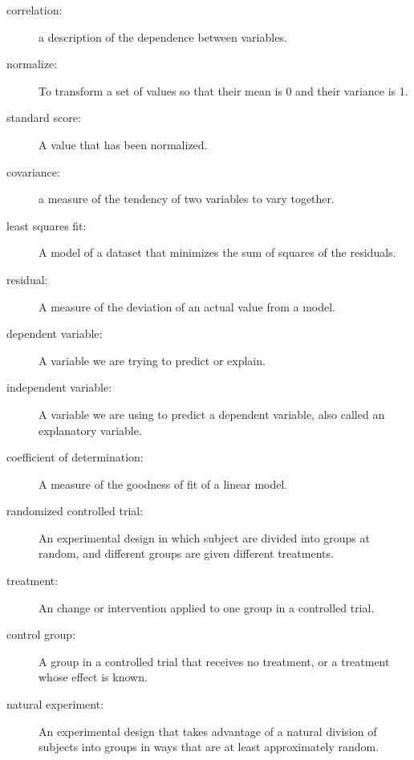 \documentclass[12pt]{book}
\begin{document}
\begin{description}

\item[correlation:] a description of the dependence between variables.

\item[normalize:] To transform a set of values so that their mean is 0 and
their variance is 1.

\item[standard score:] A value that has been normalized.

\item[covariance:] a measure of the tendency of two variables
to vary together.

\item[least squares fit:] A model of a dataset that minimizes the
sum of squares of the residuals.

\item[residual:] A measure of the deviation of an actual value from a model.

\item[dependent variable:] A variable we are trying to predict or explain.

\item[independent variable:] A variable we are using to predict a dependent
variable, also called an explanatory variable.

\item[coefficient of determination:] A measure of the goodness of fit
of a linear model.

\item[randomized controlled trial:] An experimental design in which subject
are divided into groups at random, and different groups are given different
treatments.

\item[treatment:] An change or intervention applied to one group in a
controlled trial.

\item[control group:] A group in a controlled trial that receives no
treatment, or a treatment whose effect is known.

\item[natural experiment:] An experimental design that takes advantage of
a natural division of subjects into groups in ways that are at least
approximately random.

\end{description}





\clearemptydoublepage
\end{document}
